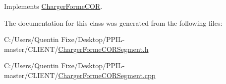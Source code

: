 Implements \hyperlink{class_charger_forme_c_o_r_a1d9563c3a1ff9d6d86aa87a83bdaf8da}{Charger\+Forme\+C\+OR}.



The documentation for this class was generated from the following files\+:\begin{DoxyCompactItemize}
\item 
C\+:/\+Users/\+Quentin Fixe/\+Desktop/\+P\+P\+I\+L-\/master/\+C\+L\+I\+E\+N\+T/\hyperlink{_charger_forme_c_o_r_segment_8h}{Charger\+Forme\+C\+O\+R\+Segment.\+h}\item 
C\+:/\+Users/\+Quentin Fixe/\+Desktop/\+P\+P\+I\+L-\/master/\+C\+L\+I\+E\+N\+T/\hyperlink{_charger_forme_c_o_r_segment_8cpp}{Charger\+Forme\+C\+O\+R\+Segment.\+cpp}\end{DoxyCompactItemize}
